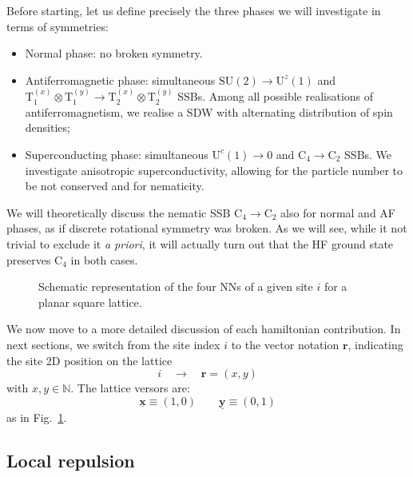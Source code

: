 Before starting, let us define precisely the three phases we will investigate in terms of symmetries:
\begin{itemize}
	\item Normal phase: no broken symmetry.
	\item Antiferromagnetic phase: simultaneous $\mathrm{SU}(2) \to \mathrm{U}^z(1)$ and $\mathrm{T}_1^{(x)} \otimes \mathrm{T}_1^{(y)} \to \mathrm{T}_2^{(x)} \otimes \mathrm{T}_2^{(y)}$ SSBs. Among all possible realisations of antiferromagnetism, we realise a SDW with alternating distribution of spin densities;
	\item Superconducting phase: simultaneous $\mathrm{U}^c(1) \to 0$ and $\mathrm{C}_4 \to \mathrm{C}_2$ SSBs. We investigate anisotropic superconductivity, allowing for the particle number to be not conserved and for nematicity.
\end{itemize}
We will theoretically discuss the nematic SSB $\mathrm{C}_4 \to \mathrm{C}_2$ also for normal and AF phases, as if discrete rotational symmetry was broken. As we will see, while it not trivial to exclude it \textit{a priori}, it will actually turn out that the HF ground state preserves $\mathrm{C}_4$ in both cases.

\begin{figure}
	\centering
	
	\caption{Schematic representation of the four NNs of a given site $i$ for a planar square lattice.}
	\label{fig:square-nearest-neighbors}
\end{figure}

We now move to a more detailed discussion of each hamiltonian contribution. In next sections, we switch from the site index $i$ to the vector notation $\mathbf{r}$, indicating the site 2D position on the lattice
\[
	i \quad\to\quad \mathbf{r} = (x,y)
\]
with $x,y \in \mathbb{N}$. The lattice versors are:
\[
	\underline{\mathbf{x}} \equiv (1,0)
	\qquad
	\underline{\mathbf{y}} \equiv (0,1)
\]
as in Fig.~\ref{fig:square-nearest-neighbors}.

\subsection{Local repulsion}


